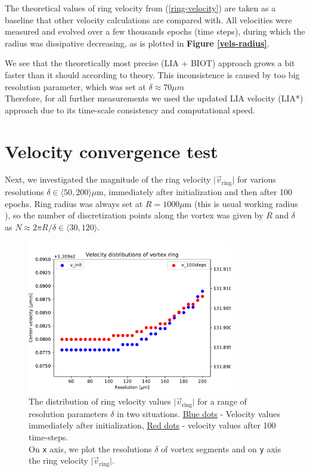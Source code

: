 The theoretical values of ring velocity from (\ref{ring-velocity}) are taken as a baseline that other velocity calculations are compared with.
All velocities were measured and evolved over a few thousands epochs (time steps), during which the radius was dissipative decreasing, as is plotted in \textbf{Figure \ref{vels-radius}}.

We see that the theoretically most precise (LIA + BIOT) approach grows a bit faster than it should according to theory. This inconsistence is caused by too big resolution parameter, which was set at $\delta \approx 70 \mu \unit{m}$\\
Therefore, for all further measurements we used the updated LIA velocity (LIA*) approach due to its time-scale consistency and computational speed.


\section{Velocity convergence test}

Next, we investigated the magnitude of the ring velocity $\vert \vec{v}_{\text{ring}} \vert$ for various resolutions $\delta \in \langle 50, 200 \rangle \mu\text{m}$, immediately after initialization and then after 100 epochs. Ring radius was always set at $R=1000\mu\text{m}$ (this is usual working radius \cite{tsubota} \cite{FDclosed}), so the number of discretization points along the vortex was given by $R$ and $\delta$ as $N \approx 2\pi R/ \delta \in \langle 30,120 \rangle$.

\begin{figure}[h]
	\centering
	\includegraphics[width=0.8\textwidth]{graphics/results/vels_convergence}
	\caption{The distribution of ring velocity values $\vert \vec{v}_{\text{ring}} \vert$ for a range of resolution parameters $\delta$ in two situations. \underline{Blue dots} - Velocity values immediately after initialization, \underline{Red dots} - velocity values after 100 time-steps.\\
	On \texttt{x} axis, we plot the resolutions $\delta$ of vortex segments and on \texttt{y} axis the ring velocity $\vert \vec{v}_{\text{ring}} \vert$.}
	\label{vels-converg}
\end{figure}

